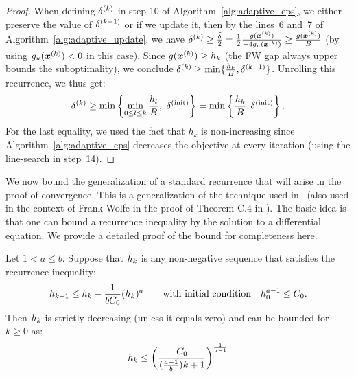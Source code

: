 \begin{proof}
	When defining $\delta^{(k)}$ in step 10 of Algorithm~\ref{alg:adaptive_eps}, we either preserve the value of $\delta^{(k-1)}$ or if we update it, then by the lines~6 and~7 of Algorithm~\ref{alg:adaptive_update}, we have $\delta^{(k)} \geq \frac{\tilde{\delta}}{2} = \frac{1}{2} \frac{g(\bm{x}^{(k)})}{-4g_u(\bm{x}^{(k)})} \geq  \frac{g(\bm{x}^{(k)})}{B}$ (by using $g_u(\bm{x}^{(k)}) < 0$ in this case). Since $g(\bm{x}^{(k)})\geq h_k$ (the FW gap always upper bounds the suboptimality), we conclude $\delta^{(k)} \geq \min\{\frac{h_k}{B}, \delta^{(k-1)}\}$. 
	Unrolling this recurrence, we thus get:
	$$\delta^{(k)} \geq \min\left\{ \min_{0\leq l \leq k} \frac{h_{l}}{B}, \, \, \delta^{(\mathrm{init})}\right\}
	=  \min\left\{ \frac{h_k}{B}, \delta^{(\mathrm{init})}\right\}. $$
	For the last equality, we used the fact that $h_k$ is non-increasing since Algorithm~\ref{alg:adaptive_eps} decreases the objective at every iteration (using the line-search in step~14).
\end{proof}

We now bound the generalization of a standard recurrence that will arise in the proof of convergence. This is a generalization of the technique used in~ (also used in the context of Frank-Wolfe in the proof of Theorem C.4 in \citet{lacoste2012block}). The basic idea is that one can bound a recurrence inequality by the solution to a differential equation. 
We provide a detailed proof of the 
bound for completeness here. 
\begin{lemma}
	\label{lem:differential_bound}
	Let $1< a \leq b$. Suppose that $h_k$ is any non-negative sequence that satisfies the recurrence inequality: 
	$$h_{k+1}\leq h_k-\frac{1}{b C_0} (h_k)^a \qquad \text{with initial condition} \quad h_0^{a-1}\leq C_0.$$
	Then $h_k$ is strictly decreasing (unless it equals zero) and can be bounded for $k \geq 0$ as: 
	$$h_{k}\leq \left(\frac{C_0}{(\frac{a-1}{b})k+1}\right)^{\frac{1}{a-1}}$$
\end{lemma}

